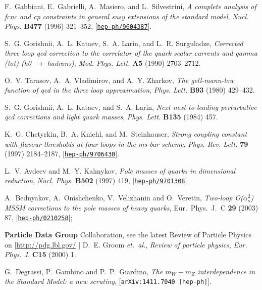 \documentclass{article}
\begin{document}
\begin{thebibliography}{10}
F.~Gabbiani, E.~Gabrielli, A.~Masiero, and L.~Silvestrini, {\it A complete
  analysis of fcnc and cp constraints in general susy extensions of the
  standard model},  {\em Nucl. Phys.} {\bf B477} (1996) 321--352,
  [\href{http://xxx.lanl.gov/abs/hep-ph/9604387}{{\tt hep-ph/9604387}}].

S.~G. Gorishnii, A.~L. Kataev, S.~A. Larin, and L.~R. Surguladze, {\it
  Corrected three loop qcd correction to the correlator of the quark scalar
  currents and gamma (tot) (h0 $\to$ hadrons)},  {\em Mod. Phys. Lett.} {\bf
  A5} (1990) 2703--2712.

O.~V. Tarasov, A.~A. Vladimirov, and A.~Y. Zharkov, {\it The gell-mann-low
  function of qcd in the three loop approximation},  {\em Phys. Lett.} {\bf
  B93} (1980) 429--432.

S.~G. Gorishnii, A.~L. Kataev, and S.~A. Larin, {\it Next next-to-leading
  perturbative qcd corrections and light quark masses},  {\em Phys. Lett.} {\bf
  B135} (1984) 457.

K.~G. Chetyrkin, B.~A. Kniehl, and M.~Steinhauser, {\it Strong coupling
  constant with flavour thresholds at four loops in the ms-bar scheme},  {\em
  Phys. Rev. Lett.} {\bf 79} (1997) 2184--2187,
  [\href{http://xxx.lanl.gov/abs/hep-ph/9706430}{{\tt hep-ph/9706430}}].

L.~V. Avdeev and M.~Y. Kalmykov, {\it Pole masses of quarks in dimensional
  reduction}, {\em Nucl. Phys. } {\bf B502} (1997) 419,
  [\href{http://xxx.lanl.gov/abs/hep-ph/9701308}{{\tt hep-ph/9701308}}].

A.~Bednyakov, A.~Onishchenko, V.~Velizhanin and O.~Veretin,
{\it Two-loop O($\alpha_s^2$) MSSM corrections to the pole masses of heavy
  quarks}, Eur.\ Phys.\ J.\ C {\bf 29} (2003) 87,
  [\href{http://xxx.lanl.gov/abs/hep-ph/0210258}{{\tt hep-ph/0210258}}];

{\bf Particle Data Group} Collaboration, 
see the latest Review of Particle Physics on 
  [\href{http://pdg.lbl.gov/}{http://pdg.lbl.gov/}
]
D.~E. Groom {\em et.~al.}, {\it Review
  of particle physics},  {\em Eur. Phys. J.} {\bf C15} (2000) 1.

G.~Degrassi, P.~Gambino and P.~P.~Giardino, {\em The $m_W-m_Z$ interdependence
in the Standard Model: a new scrutiny}, 
  [{{\tt arXiv:1411.7040 [hep-ph]}}].


\end{thebibliography}
\end{document}
